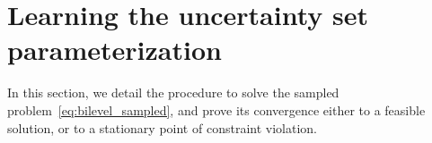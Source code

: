 \section{Learning the uncertainty set parameterization}
\label{sec:learn}
In this section, we detail the procedure to solve the sampled problem~\eqref{eq:bilevel_sampled}, and prove its convergence either to a feasible solution, or to a stationary point of constraint violation. 

